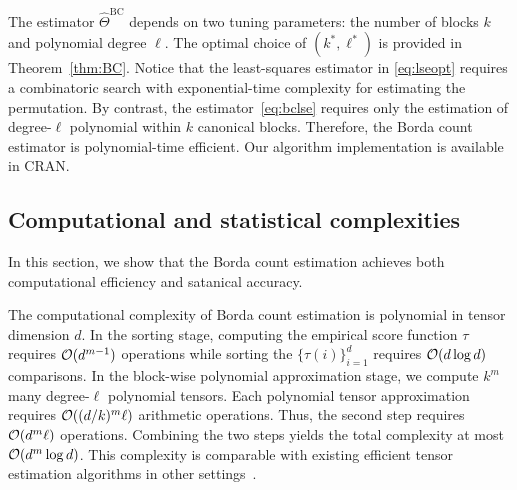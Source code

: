 \documentclass[11pt]{article}
\theoremstyle{definition}
\begin{document}
The estimator $\hat\Theta^{\text{BC}}$ depends on two tuning parameters: the number of blocks $k$ and polynomial degree $\ell$. The optimal choice of $(k^*,\ell^*)$ is provided in Theorem~\ref{thm:BC}.
 Notice that the least-squares estimator in \eqref{eq:lseopt} requires a combinatoric search with exponential-time complexity for estimating the permutation. By contrast, the estimator~\eqref{eq:bclse} requires only the estimation of degree-$\ell$ polynomial within $k$ canonical blocks. Therefore, the Borda count estimator is polynomial-time efficient. Our algorithm implementation is available in CRAN. 



\subsection{Computational and statistical complexities}
In this section, we show that the Borda count estimation achieves both computational efficiency and satanical accuracy. 

The computational complexity of Borda count estimation is polynomial in tensor dimension $d$. In the sorting stage, computing the empirical score function $\tau$ requires $\mathcal{O}(d^{m-1})$ operations while sorting the $\{\tau(i)\}_{i=1}^d$ requires $\mathcal{O}(d\log d)$ comparisons. In the block-wise polynomial approximation stage, we compute $k^m$ many degree-$\ell$ polynomial tensors. Each polynomial tensor approximation requires $\mathcal{O}((d/k)^m\ell)$ arithmetic operations. Thus, the second step requires $\mathcal{O}(d^m\ell)$ operations. Combining the two steps yields the total complexity at most $\mathcal{O}(d^m\log d)$. This complexity is comparable with existing efficient tensor estimation algorithms in other settings~\citep{li2019nearest,zhang2018tensor}.
\end{document}
